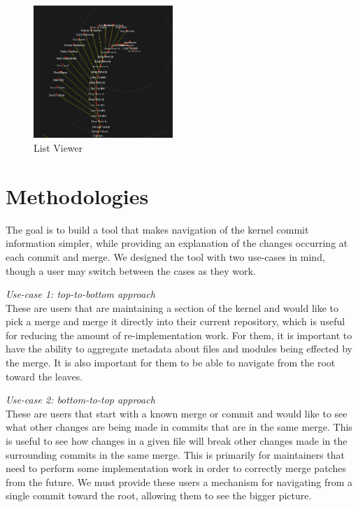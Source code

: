 \documentclass[conference, draftclsnofoot]{IEEEtran}
\begin{document}

\begin{figure}
        \centering
        \includegraphics[width=0.47\textwidth]{figures/gitvis.png}
        \caption{List Viewer}
        \label{fig:listviewer}
\end{figure}

\section{Methodologies}

The goal is to build a tool that makes navigation of the kernel commit information
simpler, while providing an explanation of the changes occurring at each commit and
merge. We designed the tool with two use-cases in mind, though a user may switch
between the cases as they work.

\textit{Use-case 1: top-to-bottom approach}\label{sec:usecase1}\\
These are users that are maintaining a section of the kernel and would like to pick
a merge and merge it directly into their current repository, which is useful for
reducing the amount of re-implementation work. For them, it is important to have the
ability to aggregate metadata about files and modules being effected by the merge.
It is also important for them to be able to navigate from the root toward the
leaves.

\textit{Use-case 2: bottom-to-top approach}\label{sec:usecase2}\\
These are users that start with a known merge or commit and would like to see what
other changes are being made in commits that are in the same merge. This is useful
to see how changes in a given file will break other changes made in the surrounding
commits in the same merge. This is primarily for maintainers that need to perform
some implementation work in order to correctly merge patches from the future. We
must provide these users a mechanism for navigating from a single commit toward the
root, allowing them to see the bigger picture.
\end{document}
